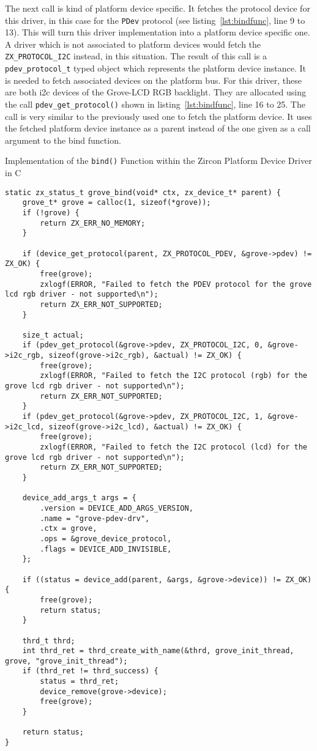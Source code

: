 The next call is kind of platform device specific.
It fetches the protocol device for this driver, in this case for the \texttt{PDev} protocol (see listing~\ref{lst:bindfunc}, line 9 to 13).
This will turn this driver implementation into a platform device specific one.
A driver which is not associated to platform devices would fetch the \texttt{ZX_PROTOCOL_I2C} instead, in this situation.
The result of this call is a \texttt{pdev_protocol_t} typed object which represents the platform device instance.
It is needed to fetch associated devices on the platform bus.
For this driver, these are both \ac{i2c} devices of the Grove-LCD RGB backlight.
They are allocated using the call \texttt{pdev_get_protocol()} shown in listing~\ref{lst:bindfunc}, line 16 to 25.
The call is very similar to the previously used one to fetch the platform device.
It uses the fetched platform device instance as a parent instead of the one given as a call argument to the bind function.
%
\begin{listing} [H]
    \caption{Implementation of the \texttt{bind()} Function within the Zircon Platform Device Driver in C}
\label{lst:bindfunc}
\begin{verbatim}
static zx_status_t grove_bind(void* ctx, zx_device_t* parent) {
    grove_t* grove = calloc(1, sizeof(*grove));
    if (!grove) {
        return ZX_ERR_NO_MEMORY;
    }

    if (device_get_protocol(parent, ZX_PROTOCOL_PDEV, &grove->pdev) != ZX_OK) {
        free(grove);
        zxlogf(ERROR, "Failed to fetch the PDEV protocol for the grove lcd rgb driver - not supported\n");
        return ZX_ERR_NOT_SUPPORTED;
    }

    size_t actual;
    if (pdev_get_protocol(&grove->pdev, ZX_PROTOCOL_I2C, 0, &grove->i2c_rgb, sizeof(grove->i2c_rgb), &actual) != ZX_OK) {
        free(grove);
        zxlogf(ERROR, "Failed to fetch the I2C protocol (rgb) for the grove lcd rgb driver - not supported\n");
        return ZX_ERR_NOT_SUPPORTED;
    }
    if (pdev_get_protocol(&grove->pdev, ZX_PROTOCOL_I2C, 1, &grove->i2c_lcd, sizeof(grove->i2c_lcd), &actual) != ZX_OK) {
        free(grove);
        zxlogf(ERROR, "Failed to fetch the I2C protocol (lcd) for the grove lcd rgb driver - not supported\n");
        return ZX_ERR_NOT_SUPPORTED;
    }

    device_add_args_t args = {
        .version = DEVICE_ADD_ARGS_VERSION,
        .name = "grove-pdev-drv",
        .ctx = grove,
        .ops = &grove_device_protocol,
        .flags = DEVICE_ADD_INVISIBLE,
    };

    if ((status = device_add(parent, &args, &grove->device)) != ZX_OK) {
        free(grove);
        return status;
    }

    thrd_t thrd;
    int thrd_ret = thrd_create_with_name(&thrd, grove_init_thread, grove, "grove_init_thread");
    if (thrd_ret != thrd_success) {
        status = thrd_ret;
        device_remove(grove->device);
        free(grove);
    }

    return status;
}
\end{verbatim}
\end{listing}
